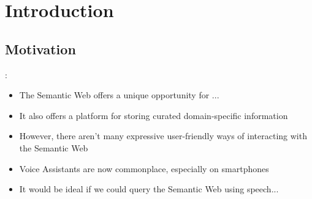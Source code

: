 \documentclass[logoontitle,tabu,supertabular,aspectratio=43]{preney-uwindsor-beamer}
\begin{document}

	\section{Introduction}

    \subsection{Motivation}
    \begin{frame}{\insertsection: \insertsubsection}
        \begin{itemize}
            \item The Semantic Web offers a unique opportunity for ...
            \item It also offers a platform for storing curated domain-specific information
            \item However, there aren't many expressive user-friendly ways of interacting with the Semantic Web

            \item Voice Assistants are now commonplace, especially on smartphones
            \item It would be ideal if we could query the Semantic Web using speech...
        \end{itemize}
    \end{frame}

\end{document}
